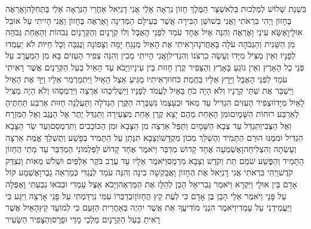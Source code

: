 \documentclass[../main/main.tex]{subfiles}
\begin{document}
\begin{multicols*}{\ncols}
בִּשְׁנַת שָׁלוֹשׁ לְמַלְכוּת בֵּלְאשַׁצַּר הַמֶּלֶךְ חָזוֹן נִרְאָה אֵלַי אֲנִי דָנִיֵּאל אַחֲרֵי הַנִּרְאָה אֵלַי בַּתְּחִלָּה\PreVerseSpace{}וָאֶרְאֶה בֶּחָזוֹן וַיְהִי בִּרְאֹתִי וַאֲנִי בְּשׁוּשַׁן הַבִּירָה אֲשֶׁר בְּעֵילָם הַמְּדִינָה וָאֶרְאֶה בֶּחָזוֹן וַאֲנִי הָיִיתִי עַל אוּבַל אוּלָי\PreVerseSpace{}וָאֶשָּׂא עֵינַי וָאֶרְאֶה וְהִנֵּה אַיִל אֶחָד עֹמֵד לִפְנֵי הָאֻבָל וְלוֹ קְרָנָיִם וְהַקְּרָנַיִם גְּבֹהוֹת וְהָאַחַת גְּבֹהָה מִן הַשֵּׁנִית וְהַגְּבֹהָה עֹלָה בָּאַחֲרֹנָה\PreVerseSpace{}רָאִיתִי אֶת הָאַיִל מְנַגֵּחַ יָמָּה וְצָפוֹנָה וָנֶגְבָּה וְכָל חַיּוֹת לֹא יַעַמְדוּ לְפָנָיו וְאֵין מַצִּיל מִיָּדוֹ וְעָשָׂה כִרְצֹנוֹ וְהִגְדִּיל\PreVerseSpace{}וַאֲנִי הָיִיתִי מֵבִין וְהִנֵּה צְפִיר הָעִזִּים בָּא מִן הַמַּעֲרָב עַל פְּנֵי כָל הָאָרֶץ וְאֵין נוֹגֵעַ בָּאָרֶץ וְהַצָּפִיר קֶרֶן חָזוּת בֵּין עֵינָיו\PreVerseSpace{}וַיָּבֹא עַד הָאַיִל בַּעַל הַקְּרָנַיִם אֲשֶׁר רָאִיתִי עֹמֵד לִפְנֵי הָאֻבָל וַיָּרָץ אֵלָיו בַּחֲמַת כֹּחוֹ\PreVerseSpace{}וּרְאִיתִיו מַגִּיעַ אֵצֶל הָאַיִל וַיִּתְמַרְמַר אֵלָיו וַיַּךְ אֶת הָאַיִל וַיְשַׁבֵּר אֶת שְׁתֵּי קְרָנָיו וְלֹא הָיָה כֹחַ בָּאַיִל לַעֲמֹד לְפָנָיו וַיַּשְׁלִיכֵהוּ אַרְצָה וַיִּרְמְסֵהוּ וְלֹא הָיָה מַצִּיל לָאַיִל מִיָּדוֹ\PreVerseSpace{}וּצְפִיר הָעִזִּים הִגְדִּיל עַד מְאֹד וּכְעָצְמוֹ נִשְׁבְּרָה הַקֶּרֶן הַגְּדֹלָה וַתַּעֲלֶנָה חָזוּת אַרְבַּע תַּחְתֶּיהָ לְאַרְבַּע רוּחוֹת הַשָּׁמָיִם\PreVerseSpace{}וּמִן הָאַחַת מֵהֶם יָצָא קֶרֶן אַחַת מִצְּעִירָה וַתִּגְדַּל יֶתֶר אֶל הַנֶּגֶב וְאֶל הַמִּזְרָח וְאֶל הַצֶּבִי\PreVerseSpace{}וַתִּגְדַּל עַד צְבָא הַשָּׁמָיִם וַתַּפֵּל אַרְצָה מִן הַצָּבָא וּמִן הַכּוֹכָבִים וַתִּרְמְסֵם\PreVerseSpace{}וְעַד שַׂר הַצָּבָא הִגְדִּיל וּמִמֶּנּוּ הוּרַם\SubEnd{} הַתָּמִיד וְהֻשְׁלַךְ מְכוֹן מִקְדָּשׁוֹ\PreVerseSpace{}וְצָבָא תִּנָּתֵן עַל הַתָּמִיד בְּפָשַׁע וְתֻשְׁלַךְ\SubEnd{} אֱמֶת אַרְצָה וְעָשְׂתָה וְהִצְלִיחָה\PreVerseSpace{}וָאֶשְׁמְעָה אֶחָד קָדוֹשׁ מְדַבֵּר וַיֹּאמֶר אֶחָד קָדוֹשׁ לַפַּלְמוֹנִי הַמְדַבֵּר עַד מָתַי הֶחָזוֹן הַתָּמִיד וְהַפֶּשַׁע שֹׁמֵם תֵּת וְקֹדֶשׁ וְצָבָא מִרְמָס\PreVerseSpace{}וַיֹּאמֶר אֵלָיו\SubEnd{} עַד עֶרֶב בֹּקֶר אַלְפַּיִם וּשְׁלֹשׁ מֵאוֹת וְנִצְדַּק קֹדֶשׁ\PreVerseSpace{}וַיְהִי בִּרְאֹתִי אֲנִי דָנִיֵּאל אֶת הֶחָזוֹן וָאֲבַקְשָׁה בִינָה וְהִנֵּה עֹמֵד לְנֶגְדִּי כְּמַרְאֵה גָבֶר\PreVerseSpace{}וָאֶשְׁמַע קוֹל אָדָם בֵּין אוּלָי וַיִּקְרָא וַיֹּאמַר גַּבְרִיאֵל הָבֵן לְהַלָּז אֶת הַמַּרְאֶה\PreVerseSpace{}וַיָּבֹא אֵצֶל עָמְדִי וּבְבֹאוֹ נִבְעַתִּי וָאֶפְּלָה עַל פָּנָי וַיֹּאמֶר אֵלַי הָבֵן בֶּן אָדָם כִּי לְעֶת קֵץ הֶחָזוֹן\PreVerseSpace{}וּבְדַבְּרוֹ עִמִּי נִרְדַּמְתִּי עַל פָּנַי אָרְצָה וַיִּגַּע בִּי וַיַּעֲמִידֵנִי עַל עָמְדִי\PreVerseSpace{}וַיֹּאמֶר הִנְנִי מוֹדִיעֲךָ אֵת אֲשֶׁר יִהְיֶה בְּאַחֲרִית הַזָּעַם כִּי לְמוֹעֵד קֵץ\PreVerseSpace{}הָאַיִל אֲשֶׁר רָאִיתָ בַּעַל הַקְּרָנָיִם מַלְכֵי מָדַי וּפָרָס\PreVerseSpace{}וְהַצָּפִיר הַשָּׂעִיר 
\end{multicols*}
\end{document}
